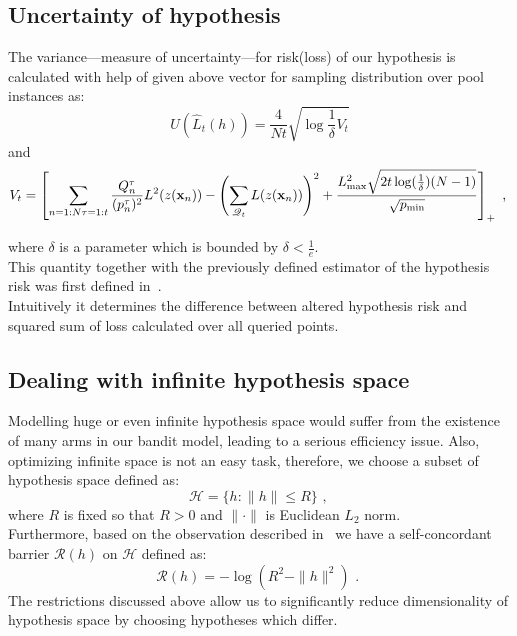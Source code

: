 \documentclass[12pt, a4paper, pdflatex, leqno, twoside]{report}
\begin{document}
\subsection{Uncertainty of hypothesis\label{sec:uncertanity}}
The variance---measure of uncertainty---for risk(loss) of our hypothesis 
is calculated with help of given above vector for sampling distribution 
over pool instances as:
\begin{equation}\label{eq:variance}
U(\hat{L}_t(h)) = \frac{4}{Nt} \sqrt{\log\frac{1}{\delta}V_t}
\end{equation}
and
$$
V_t = \left[
\sum_{n = 1:N \\ \tau = 1:t} \frac{Q^\tau_n}{(p^\tau_n)^2} L^2(z(\mathbf{x}_n))
-
\left( \sum_{\mathscr{Q}_t} L(z(\mathbf{x}_n)) \right)^2
+
\frac{L^2_{\text{max}}  \sqrt{2t \log(\frac{1}{\delta}) (N-1)} } 
{\sqrt{p_{\text{min}}}}
\right]_+ \text{~,~}
$$

where $\delta$ is a parameter which is bounded by $\delta < \frac{1}{e}$.\\

This quantity together with the previously defined estimator of the hypothesis risk 
was first defined in~\citep{DBLP:journals/corr/GantiG13}.\\
Intuitively it determines the difference between altered hypothesis risk and squared sum of loss calculated over all queried points.\\

\subsection{Dealing with infinite hypothesis space}
Modelling huge or even infinite hypothesis space would suffer from the existence of 
many arms in our bandit model, leading to a serious efficiency issue. Also, 
optimizing infinite space is not an easy task, therefore, we choose a subset of 
hypothesis space defined as:
$$
\mathscr{H} = \{ h : \|h\| \leq R \} \text{~,~}
$$
where $R$ is fixed so that $R > 0$ and $\| \cdot \|$ is Euclidean $L_2$ norm.\\
Furthermore, based on the observation described in~\citep{Abernethy08competingin} 
we have a self-concordant barrier $\mathscr{R}(h)$ on $\mathscr{H}$ defined as:
$$
\mathscr{R}(h) = - \log(R^2 - \|h\|^2) \text{~.~}
$$
The restrictions discussed above allow us to significantly reduce dimensionality of 
hypothesis space by choosing hypotheses which differ.\\
\end{document}
